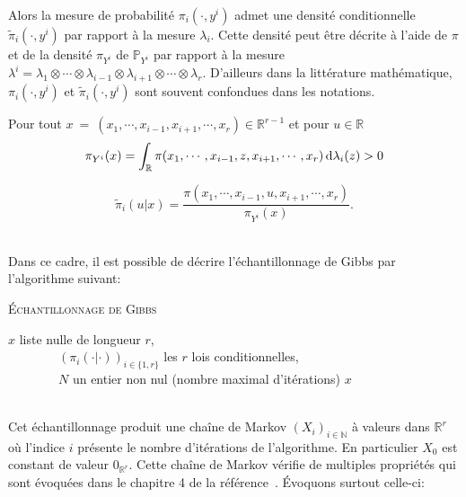 ~\\
Alors la mesure de probabilité $\pi_i(\cdot, y^i)$ admet une  densité conditionnelle $\tilde{\pi}_i(\cdot, y^i)$ par rapport à la mesure $\lambda_i$. Cette densité peut être décrite
  à l'aide de $\pi$ et de la densité $\pi_{Y^i}$ de $\mathbb{P}_{Y^i}$ par rapport à la mesure 
  $\lambda^i = \lambda_1 \otimes \cdots \otimes \lambda_{i-1} \otimes \lambda_{i+1} \otimes \cdots \otimes \lambda_r$. D'ailleurs dans la littérature mathématique, $\pi_i(\cdot, y^i)$ et $\tilde{\pi}_i(\cdot, y^i)$
sont souvent confondues dans les notations.


\begin{remark}
  Pour tout $x~=~(x_1, \cdots, x_{i-1}, x_{i+1}, \cdots, x_{r}) \in \mathbb{R}^{r-1}$ et pour $u \in \mathbb{R}$
\begin{equation*}
  \pi_{Y^i}(x) = \displaystyle\int_{\mathbb{R}} \pi(x_1, \cdots, x_{i-1},z,x_{i+1}, \cdots, x_{r}) \,\mathrm{d} \lambda_i(z)  > 0
\end{equation*}

\begin{equation*}
\tilde{\pi}_i(u|x) = \frac{\pi(x_1, \cdots, x_{i-1},u,x_{i+1}, \cdots, x_{r})}{\pi_{Y^i}(x)}.
\end{equation*}

\end{remark}

~\\
Dans ce cadre, il est possible de décrire l'échantillonnage de Gibbs par
l'algorithme suivant:
~\\
\begin{algorithm}
\caption{\textsc{Échantillonnage de Gibbs}}
\label{algo3}
\begin{algorithmic}
\REQUIRE $x$ liste nulle de longueur $r$,\\ $\qquad \qquad (\pi_i(\cdot | \cdot))_{i \in \{1,r\}}$ les $r$ lois conditionnelles,\\ $\qquad \qquad N$ un entier non nul (nombre maximal d'itérations)
\BEGIN 
{}  
\ENDFOR
\END
\ENSURE $x$ \\
\end{algorithmic}
\end{algorithm}

~\\
Cet échantillonnage produit une chaîne de Markov $(X_i)_{i \in \mathbb{N}}$ à valeurs dans $\mathbb{R}^r$ où l'indice $i$ présente le nombre d'itérations de l'algorithme.
En particulier $X_0$ est constant de valeur $0_{\mathbb{R}^r}$. Cette chaîne de Markov vérifie de multiples propriétés qui sont évoquées dans le chapitre 4 de la référence~\cite{GaetanCarlo2009SSaM}. Évoquons surtout celle-ci:

